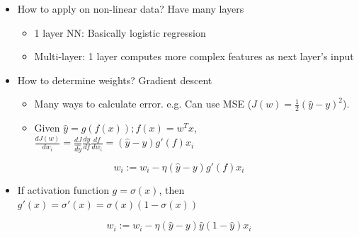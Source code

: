 \documentclass{article}
\begin{document}
\begin{multicols*}{3}
\begin{itemize}
    \item How to apply on non-linear data? Have many layers
    \begin{itemize}
        \item 1 layer NN: Basically logistic regression
        \item Multi-layer: 1 layer computes more complex features as next layer's input
    \end{itemize}
    \item How to determine weights? Gradient descent
    \begin{itemize}
        \item Many ways to calculate error. e.g. Can use MSE ($J(w) = \frac{1}{2} (\hat{y} - y)^2$).
        \item Given $\hat{y} = g(f(x)); f(x) = w^T x$, $\frac{dJ(w)}{d w_i} = \frac{d J}{\hat{d y}} \frac{d\hat{y}}{df} \frac{df}{d w_i} = (\hat{y} - y)g'(f)x_i$
    \end{itemize}
\end{itemize}

\[w_i := w_i - \eta (\hat{y} - y) g'(f) x_i\]

\begin{itemize}
    \item If activation function $g = \sigma(x)$, then $g'(x) = \sigma'(x) = \sigma(x)(1 - \sigma(x))$
\end{itemize}

\[w_i := w_i - \eta (\hat{y} - y) \hat{y} (1 - \hat{y}) x_i\]

\end{multicols*}
\end{document}
